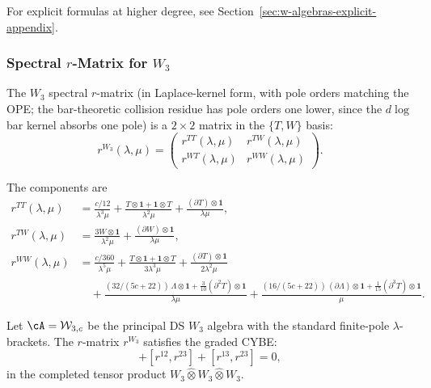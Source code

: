 For explicit formulas at higher degree, see Section~\ref{sec:w-algebras-explicit-appendix}.

\subsubsection{Spectral $r$-Matrix for $W_3$}

The $W_3$ spectral $r$-matrix (in Laplace-kernel form, with pole
orders matching the OPE; the bar-theoretic collision residue has
pole orders one lower, since the $d\log$ bar kernel absorbs one pole) is a $2 \times 2$ matrix in the
$\{T, W\}$ basis:
\begin{equation}
r^{W_3}(\lambda, \mu) = \begin{pmatrix}
r^{TT}(\lambda,\mu) & r^{TW}(\lambda,\mu) \\
r^{WT}(\lambda,\mu) & r^{WW}(\lambda,\mu)
\end{pmatrix}.
\end{equation}

The components are
\begin{align}
r^{TT}(\lambda,\mu) &= \frac{c/12}{\lambda^3 \mu} + \frac{T \otimes \mathbf{1} + \mathbf{1} \otimes T}{\lambda^2 \mu} + \frac{(\partial T) \otimes \mathbf{1}}{\lambda \mu},\\
r^{TW}(\lambda,\mu) &= \frac{3W \otimes \mathbf{1}}{\lambda^2 \mu} + \frac{(\partial W) \otimes \mathbf{1}}{\lambda \mu},\\
r^{WW}(\lambda,\mu) &= \frac{c/360}{\lambda^5 \mu} + \frac{T \otimes \mathbf{1} + \mathbf{1} \otimes T}{3\lambda^3 \mu} + \frac{(\partial T) \otimes \mathbf{1}}{2\lambda^2 \mu} \\
&\quad + \frac{(32/(5c+22))\,\Lambda \otimes \mathbf{1} + \tfrac{3}{10}(\partial^2 T) \otimes \mathbf{1}}{\lambda \mu} + \frac{(16/(5c+22))\,(\partial\Lambda) \otimes \mathbf{1} + \tfrac{1}{15}(\partial^3 T) \otimes \mathbf{1}}{\mu}.
\end{align}

\begin{theorem}
\label{thm:w3-CYBE}
Let\/ $\cA=\mathcal W_{3,c}$ be the principal DS $W_3$ algebra with
the standard finite-pole $\lambda$-brackets.
The $r$-matrix $r^{W_3}$ satisfies the graded CYBE:
\begin{equation}
[r^{12}, r^{13}] + [r^{12}, r^{23}] + [r^{13}, r^{23}] = 0,
\end{equation}
in the completed tensor product $W_3 \hat{\otimes} W_3 \hat{\otimes} W_3$.
\end{theorem}

